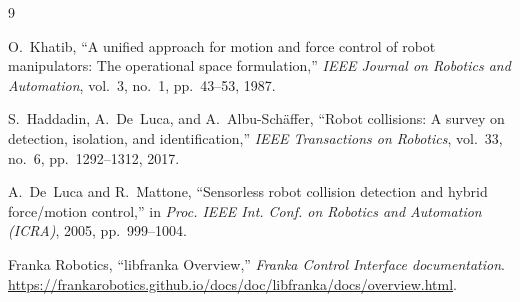 \documentclass[12pt,a4paper]{article}
\begin{document}

\clearpage
\begin{thebibliography}{9}
{}
O.~Khatib, ``A unified approach for motion and force control of robot manipulators:
The operational space formulation,'' \emph{IEEE Journal on Robotics and Automation},
vol.~3, no.~1, pp.~43--53, 1987.

S.~Haddadin, A.~De~Luca, and A.~Albu-Sch\"affer, ``Robot collisions: A survey on
detection, isolation, and identification,'' \emph{IEEE Transactions on Robotics},
vol.~33, no.~6, pp.~1292--1312, 2017.

A.~De~Luca and R.~Mattone, ``Sensorless robot collision detection and hybrid
force/motion control,'' in \emph{Proc. IEEE Int. Conf. on Robotics and Automation
(ICRA)}, 2005, pp.~999--1004.

Franka Robotics, ``libfranka Overview,'' \emph{Franka Control Interface documentation}.
\url{https://frankarobotics.github.io/docs/doc/libfranka/docs/overview.html}.
\end{thebibliography}
\end{document}
